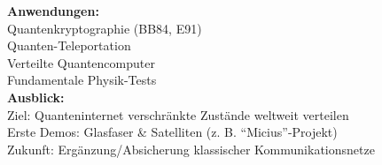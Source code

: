 \begin{frame}
	\textbf{Anwendungen:}\\
	Quantenkryptographie (BB84, E91)\\
	Quanten-Teleportation\\
	Verteilte Quantencomputer\\
	Fundamentale Physik-Tests\\
	\vspace{1em}
	\textbf{Ausblick:}\\
	Ziel: Quanteninternet \textrightarrow{ }verschr{\"a}nkte Zust{\"a}nde weltweit verteilen\\
	Erste Demos: Glasfaser \& Satelliten (z. B. \enquote{Micius}-Projekt)\\
	Zukunft: Erg{\"a}nzung/Absicherung klassischer Kommunikationsnetze
\end{frame}